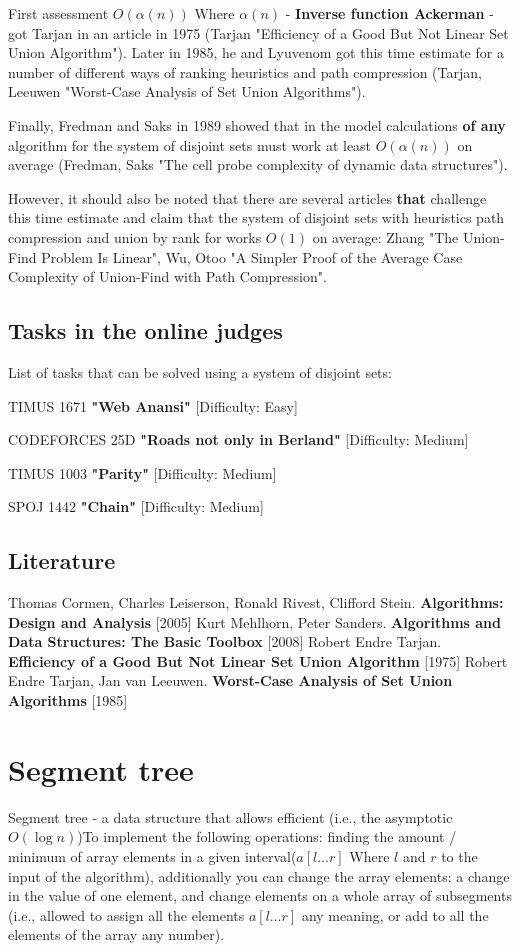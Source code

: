 First assessment $O (\alpha (n))$ Where $\alpha (n)$ - \textbf{Inverse function Ackerman} - got Tarjan in an article in 1975 (Tarjan "Efficiency of a Good But Not Linear Set Union Algorithm"). Later in 1985, he and Lyuvenom got this time estimate for a number of different ways of ranking heuristics and path compression (Tarjan, Leeuwen "Worst-Case Analysis of Set Union Algorithms").

Finally, Fredman and Saks in 1989 showed that in the model calculations \textbf{of any} algorithm for the system of disjoint sets must work at least $O (\alpha (n))$ on average (Fredman, Saks "The cell probe complexity of dynamic data structures").

However, it should also be noted that there are several articles \textbf{that} challenge this time estimate and claim that the system of disjoint sets with heuristics path compression and union by rank for works $O (1)$ on average: Zhang "The Union-Find Problem Is Linear", Wu, Otoo "A Simpler Proof of the Average Case Complexity of Union-Find with Path Compression".

\subsection{ Tasks in the online judges }

List of tasks that can be solved using a system of disjoint sets:

TIMUS 1671 \textbf{"Web Anansi"} [Difficulty: Easy]

CODEFORCES 25D \textbf{"Roads not only in Berland"} [Difficulty: Medium]

TIMUS 1003 \textbf{"Parity"} [Difficulty: Medium]

SPOJ 1442 \textbf{"Chain"} [Difficulty: Medium]

\subsection{ Literature }

Thomas Cormen, Charles Leiserson, Ronald Rivest, Clifford Stein. \textbf{Algorithms: Design and Analysis} [2005]
Kurt Mehlhorn, Peter Sanders. \textbf{Algorithms and Data Structures: The Basic Toolbox} [2008]
Robert Endre Tarjan. \textbf{Efficiency of a Good But Not Linear Set Union Algorithm} [1975]
Robert Endre Tarjan, Jan van Leeuwen. \textbf{Worst-Case Analysis of Set Union Algorithms} [1985]

\section{ Segment tree }
Segment tree - a data structure that allows efficient (i.e., the asymptotic $O (\log n)$)To implement the following operations: finding the amount / minimum of array elements in a given interval($a [l \ldots r]$ Where $l$ and $r$ to the input of the algorithm), additionally you can change the array elements: a change in the value of one element, and change elements on a whole array of subsegments (i.e., allowed to assign all the elements $a [l \ldots r]$ any meaning, or add to all the elements of the array any number).

